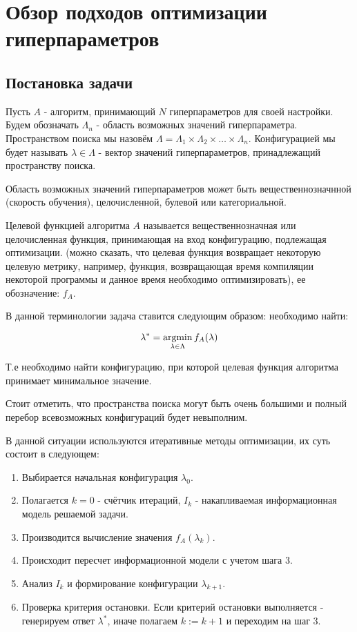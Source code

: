 \section{Обзор подходов оптимизации гиперпараметров}

\subsection{Постановка задачи}

Пусть $A$ - алгоритм, принимающий $N$ гиперпараметров для своей настройки. Будем обозначать $\Lambda_n$ - область возможных значений гиперпараметра. Пространством поиска мы назовём $\Lambda = \Lambda_1 \times \Lambda_2 \times \dots \times \Lambda_n$. Конфигурацией мы будет называть $\lambda \in \Lambda$ - вектор значений гиперпараметров, принадлежащий пространству поиска. 

Область возможных значений гиперпараметров может быть вещественнозначнной (скорость обучения), целочисленной, булевой или категориальной. 

Целевой функцией алгоритма $A$ называется вещественнозначная или целочисленная функция, принимающая на вход конфигурацию, подлежащая оптимизации. (можно сказать, что целевая функция возвращает некоторую целевую метрику, например, функция, возвращающая время компиляции некоторой программы и данное время необходимо оптимизировать), ее обозначение: $f_A$.


В данной терминологии задача ставится следующим образом: необходимо найти: 

\begin{equation}
	\lambda^* = \mathop{\mathrm{argmin}}_{\lambda \in \Lambda} f_A(\lambda)
\end{equation}

Т.е необходимо найти конфигурацию, при которой целевая функция алгоритма принимает минимальное значение. 

Стоит отметить, что пространства поиска могут быть очень большими и полный перебор всевозможных конфигураций будет невыполним. 

В данной ситуации используются итеративные методы оптимизации, их суть состоит в следующем: 

\begin{enumerate}
	\item Выбирается начальная конфигурация $\lambda_0$.
	\item Полагается $k=0$ - счётчик итераций, $I_k$ - накапливаемая информационная модель решаемой задачи.
	\item Производится вычисление значения $f_A(\lambda_k)$.
	\item Происходит пересчет информационной модели с учетом шага 3. 
	\item Анализ $I_k$ и формирование конфигурации $\lambda_{k+1}$.
	\item Проверка критерия остановки. Если критерий остановки выполняется - генерируем ответ $\lambda^*$, иначе полагаем $k:=k+1$ и переходим на шаг 3.
\end{enumerate}

\clearpage
